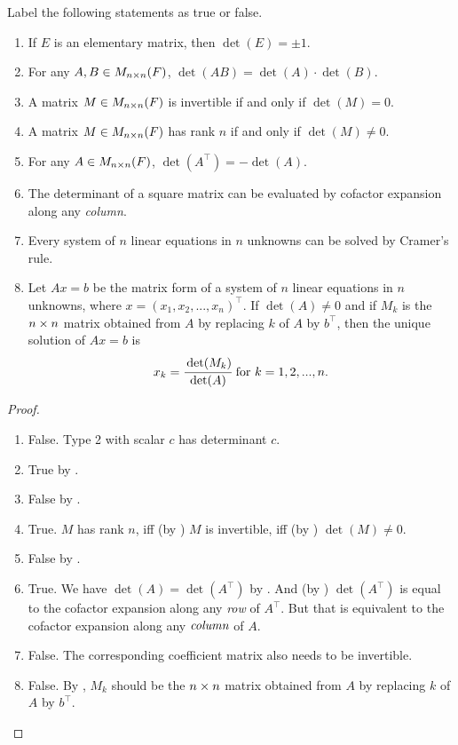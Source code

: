 \exercisesection

\begin{exercise} \label{exercise 4.3.1}
Label the following statements as true or false.
\begin{enumerate}
\item If \(E\) is an elementary matrix, then \(\det(E) = \pm 1\).
\item For any \(A, B \in M_{n \times n}(F)\), \(\det(AB) = \det(A) \cdot \det(B)\).
\item A matrix \(M \in M_{n \times n}(F)\) is invertible if and only if \(\det(M) = 0\).
\item A matrix \(M \in M_{n \times n}(F)\) has rank \(n\) if and only if \(\det(M) \ne 0\).
\item For any \(A \in M_{n \times n}(F)\), \(\det(A^\top) = -\det(A)\).
\item The determinant of a square matrix can be evaluated by cofactor expansion along any \emph{column}.
\item Every system of \(n\) linear equations in \(n\) unknowns can be solved by Cramer's rule.
\item Let \(Ax = b\) be the matrix form of a system of \(n\) linear equations in \(n\) unknowns, where \(x = (x_1, x_2, ..., x_n)^\top\).
If \(\det(A) \ne 0\) and if \(M_k\) is the \(n \times n\) matrix obtained from \(A\) by replacing  \(k\) of \(A\) by \(b^\top\), then the unique solution of \(Ax = b\) is
\[
    x_k = \cfrac{\det(M_k)}{\det(A)} \text{ for } k = 1, 2, ..., n.
\]
\end{enumerate}
\end{exercise}

\begin{proof} \ 

\begin{enumerate}
\item False. Type 2 with scalar \(c\) has determinant \(c\).
\item True by .
\item False by .
\item True. \(M\) has rank \(n\), iff (by ) \(M\) is invertible, iff (by ) \(\det(M) \ne 0\).
\item False by .
\item True.
    We have \(\det(A) = \det(A^\top)\) by .
    And (by ) \(\det(A^\top)\) is equal to the cofactor expansion along any \emph{row} of \(A^\top\).
    But that is equivalent to the cofactor expansion along any \(\emph{column}\) of \(A\).
\item False.
    The corresponding coefficient matrix also needs to be invertible.
\item False. By , \(M_k\) should be the \(n \times n\) matrix obtained from \(A\) by replacing  \(k\) of \(A\) by \(b^\top\).
\end{enumerate}
\end{proof}

